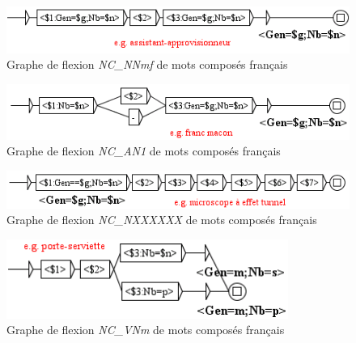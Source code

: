 \begin{figure}[!htb]
  \centering
  \includegraphics[width=12cm]{resources/img/NC'NNmf'FR.png}
  \caption{Graphe de flexion \emph{NC\_NNmf} de mots composés français}
  \label{fig:NC'NNmf'FR}
\end{figure}

\begin{figure}[!htb]
  \centering
  \includegraphics[width=12cm]{resources/img/NC'AN1'FR.png}
  \caption{Graphe de flexion \emph{NC\_AN1} de mots composés français}
  \label{fig:NC'AN1'FR}
\end{figure}

\begin{figure}[!htb]
  \centering
  \includegraphics[width=12.2cm]{resources/img/NC'NXXXXXX'FR.png}
  \caption{Graphe de flexion \emph{NC\_NXXXXXX} de mots composés français}
  \label{fig:NC'NXXXXXX'FR}
\end{figure}

\begin{figure}[!htb]
  \centering
  \includegraphics[width=9.2cm]{resources/img/NC'VNm'FR.png}
  \caption{Graphe de flexion \emph{NC\_VNm} de mots composés français}
  \label{fig:NC'VNm'FR}
\end{figure}


